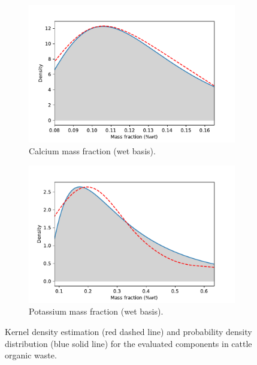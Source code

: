\documentclass[10pt,a4paper]{article}
\begin{document}
\begin{figure}[H]
	\begin{subfigure}[t]{0.45\textwidth}
		\includegraphics[width=\linewidth]{Ca_dist.pdf}
		\caption{Calcium mass fraction (wet basis).}
		\label{fig:Ca_KDE}
	\end{subfigure}
	\qquad
	\begin{subfigure}[t]{0.45\textwidth}
		\includegraphics[width=\linewidth]{K_dist.pdf}
		\caption{Potassium mass fraction (wet basis).}
		\label{fig:K_KDE}
	\end{subfigure}
	\caption{Kernel density estimation (red dashed line) and probability density distribution (blue solid line) for the evaluated components in cattle organic waste.}
	\label{fig:components_distributions}
\end{figure}

\newpage
\end{document}
